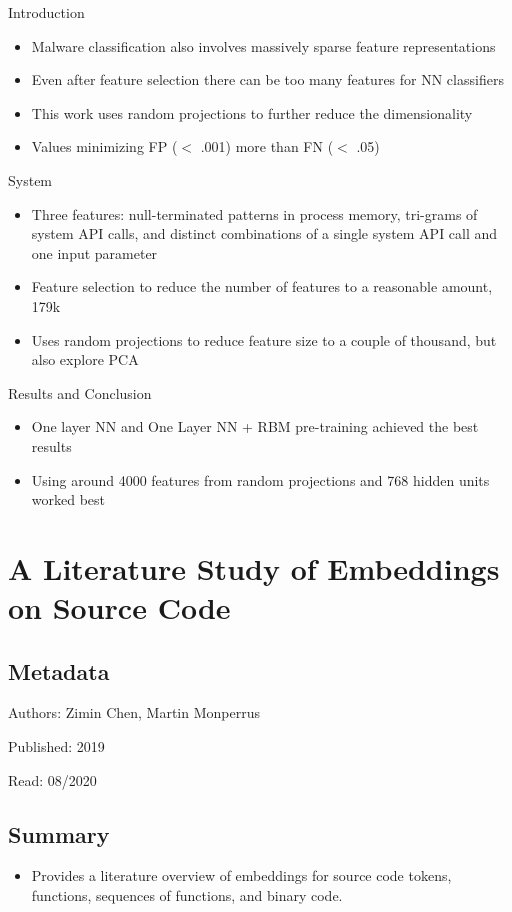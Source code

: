 \documentclass{article}
\begin{document}
Introduction
\begin{itemize}
\item Malware classification also involves massively sparse feature representations
\item Even after feature selection there can be too many features for NN classifiers
\item This work uses random projections to further reduce the dimensionality
\item Values minimizing FP ($<$ .001) more than FN ($<$ .05)
\end{itemize}
System
\begin{itemize}
\item Three features: null-terminated patterns in process memory, tri-grams of system API calls, and distinct combinations of a single system API call and one input parameter
\item Feature selection to reduce the number of features to a reasonable amount, 179k
\item Uses random projections to reduce feature size to a couple of thousand, but also explore PCA
\end{itemize}
Results and Conclusion
\begin{itemize}
\item One layer NN and One Layer NN + RBM pre-training achieved the best results
\item Using around 4000 features from random projections and 768 hidden units worked best
\end{itemize}

\pagebreak


\section*{A Literature Study of Embeddings on Source Code}

\subsection*{Metadata}

\noindent Authors: Zimin Chen, Martin Monperrus

\noindent Published: 2019

\noindent Read: 08/2020

\subsection*{Summary}
\begin{itemize}
\item Provides a literature overview of embeddings for source code tokens, functions, sequences of functions, and binary code.
\end{itemize}
\end{document}
